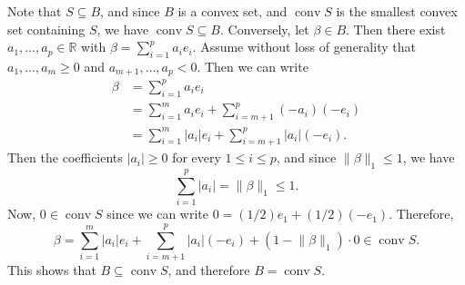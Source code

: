 \documentclass[letterpaper,12pt]{article}
\DeclareMathOperator{\conv}{conv}
\newcommand{\norm}[1]{\lVert#1\rVert}
\begin{document}
Note that $S \subseteq B$, and since $B$ is a convex set, and
$\conv S$ is the smallest convex set containing $S$, we have
$\conv S \subseteq B$. Conversely, let $\beta \in B$. Then there exist
$a_1, \ldots, a_p \in \mathbb{R}$ with $\beta = \sum_{i=1}^p a_i
e_i$. Assume without loss of generality that $a_1, \ldots, a_m \geq 0$
and $a_{m+1}, \ldots, a_p < 0$. Then we can write
\begin{align*}
  \beta &= \sum_{i=1}^p a_i e_i \\
    &= \sum_{i=1}^m a_i e_i
      + \sum_{i=m+1}^p (-a_i)(-e_i) \\
    &= \sum_{i=1}^m |a_i| e_i
      + \sum_{i=m+1}^p |a_i| (-e_i).
\end{align*}
Then the coefficients $|a_i| \geq 0$ for every $1 \leq i \leq p$, and
since $\norm{\beta}_1 \leq 1$, we have
\begin{equation*}
  \sum_{i=1}^p |a_i| = \norm{\beta}_1 \leq 1.
\end{equation*}
Now, $0 \in \conv S$ since we can write
$0 = (1/2) e_1 + (1/2) (-e_1)$. Therefore,
\begin{equation*}
  \beta = \sum_{i=1}^m |a_i| e_i + \sum_{i=m+1}^p |a_i| (-e_i)
    + (1 - \norm{\beta}_1) \cdot 0 \in \conv S.
\end{equation*}
This shows that $B \subseteq \conv S$, and therefore $B = \conv S$.
\end{document}
